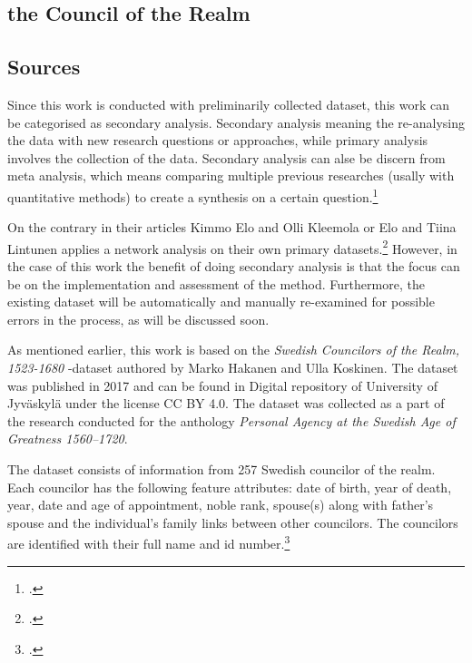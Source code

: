 \documentclass[a4paper,12pt]{article}
\begin{document}
\begin{onehalfspace}
\subsection{the Council of the Realm}

\subsection{Sources}
Since this work is conducted with preliminarily collected dataset, this work can be categorised as secondary analysis. Secondary analysis meaning the re-analysing the data with new research questions or approaches, while primary analysis involves the collection of the data. Secondary analysis can alse be discern from meta analysis, which means comparing multiple previous researches (usally with quantitative methods) to create a synthesis on a certain question.\footcite[p. 4-5.]{meta-analysis} 

On the contrary in their articles Kimmo Elo and Olli Kleemola or Elo and Tiina Lintunen applies a network analysis on their own primary datasets.\footcites{eloAklee15}{LintunenAndElo2019} However, in the case of this work the benefit of doing secondary analysis is that the focus can be on the implementation and assessment of the method. Furthermore, the existing dataset will be automatically and manually re-examined for possible errors in the process, as will be discussed soon. 

As mentioned earlier, this work is based on the \textit{Swedish Councilors of the Realm, 1523-1680} -dataset authored by Marko Hakanen and Ulla Koskinen. The dataset was published in 2017 and can be found in Digital repository of University of Jyväskylä under the license CC BY 4.0. The dataset was collected as a part of the research conducted for the anthology \textit{Personal Agency at the Swedish Age of Greatness 1560–1720}.

The dataset consists of information from 257 Swedish councilor of the realm. Each councilor has the following feature attributes: date of birth, year of death, year, date and age of appointment, noble rank, spouse(s) along with father's spouse and the individual's family links between other councilors. The councilors are identified with their full name and id number.\footcites[p. 48.]{HakanenAKoskinen2017}{councilorsDS}


\end{onehalfspace}
\end{document}
